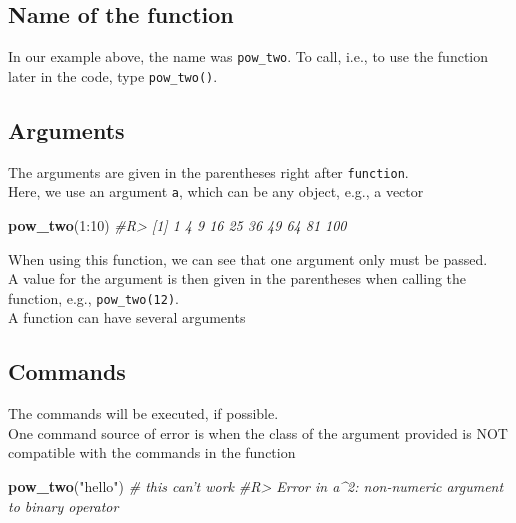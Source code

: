 \documentclass[]{book}
\newenvironment{Shaded}{}{}
\newcommand{\CommentTok}[1]{\textcolor[rgb]{0.38,0.63,0.69}{\textit{#1}}}
\newcommand{\DecValTok}[1]{\textcolor[rgb]{0.25,0.63,0.44}{#1}}
\newcommand{\KeywordTok}[1]{\textcolor[rgb]{0.00,0.44,0.13}{\textbf{#1}}}
\newcommand{\NormalTok}[1]{#1}
\newcommand{\OperatorTok}[1]{\textcolor[rgb]{0.40,0.40,0.40}{#1}}
\newcommand{\StringTok}[1]{\textcolor[rgb]{0.25,0.44,0.63}{#1}}
\theoremstyle{definition}
\theoremstyle{definition}
\theoremstyle{definition}
\theoremstyle{remark}
\begin{document}
\hypertarget{name-of-the-function}{%
\subsection{Name of the function}\label{name-of-the-function}}

In our example above, the name was \texttt{pow\_two}. To call, i.e., to
use the function later in the code, type \texttt{pow\_two()}.

\hypertarget{arguments}{%
\subsection{Arguments}\label{arguments}}

The arguments are given in the parentheses right after
\texttt{function}.\\
Here, we use an argument \texttt{a}, which can be any object, e.g., a
vector

\begin{Shaded}
\begin{Highlighting}[]
\KeywordTok{pow_two}\NormalTok{(}\DecValTok{1}\OperatorTok{:}\DecValTok{10}\NormalTok{)}
\CommentTok{#R>  [1]   1   4   9  16  25  36  49  64  81 100}
\end{Highlighting}
\end{Shaded}

When using this function, we can see that one argument only must be
passed.\\
A value for the argument is then given in the parentheses when calling
the function, e.g., \texttt{pow\_two(12)}.\\
A function can have several arguments

\hypertarget{commands}{%
\subsection{Commands}\label{commands}}

The commands will be executed, if possible.\\
One command source of error is when the class of the argument provided
is NOT compatible with the commands in the function

\begin{Shaded}
\begin{Highlighting}[]
\KeywordTok{pow_two}\NormalTok{(}\StringTok{"hello"}\NormalTok{) }\CommentTok{# this can't work}
\CommentTok{#R> Error in a^2: non-numeric argument to binary operator}
\end{Highlighting}
\end{Shaded}
\end{document}
